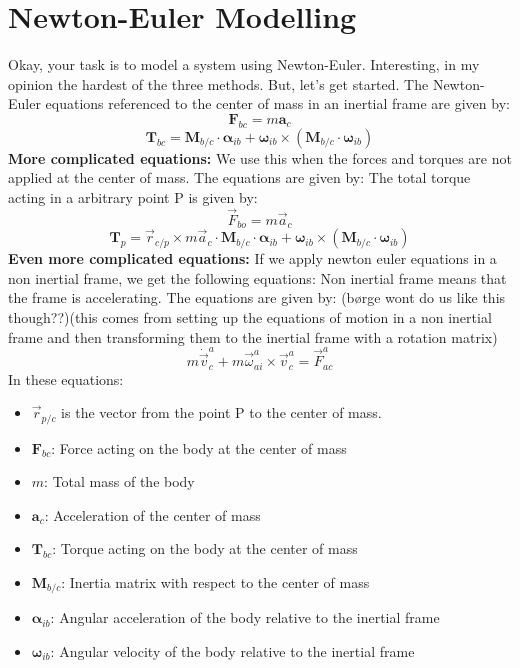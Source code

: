 \section{Newton-Euler Modelling}
Okay, your task is to model a system using Newton-Euler. Interesting, in my opinion the hardest of the three methods. But, let's get started.\newline
The Newton-Euler equations referenced to the center of mass in an inertial frame are given by:
\begin{equation}
    \mathbf{F}_{bc} = m \mathbf{a}_c
\end{equation}
\begin{equation}
    \mathbf{T}_{bc} = \mathbf{M}_{b/c} \cdot \boldsymbol{\alpha}_{ib} + \boldsymbol{\omega}_{ib} \times \left( \mathbf{M}_{b/c} \cdot \boldsymbol{\omega}_{ib} \right)
\end{equation}
\textbf{More complicated equations: } \newline
We use this when the forces and torques are not applied at the center of mass. The equations are given by:
The total torque acting in a arbitrary point P is given by:
\begin{equation}
    \vec{F}_{bo} = m \vec{a}_c
\end{equation}
\begin{equation}
    \mathbf{T}_{p} = \vec{r}_{c/p} \times m \vec{a}_c \cdot \mathbf{M}_{b/c} \cdot \boldsymbol{\alpha}_{ib} + \boldsymbol{\omega}_{ib} \times \left( \mathbf{M}_{b/c} \cdot \boldsymbol{\omega}_{ib} \right)
\end{equation}   
\textbf{Even more complicated equations: } \newline
If we apply newton euler equations in a non inertial frame, we get the following equations:
Non inertial frame means that the frame is accelerating. The equations are given by:
(børge wont do us like this though??)(this comes from setting up the equations of motion in a non inertial frame and then transforming them to the inertial frame with a rotation matrix)
\begin{equation}
    m \dot{\vec{v}}_c^a + m \vec{\omega}_{ai}^a \times \vec{v}_c^a = \vec{F}_{ac}^{a}
\end{equation}
In these equations:
\begin{itemize}
    \item $\vec{r}_{p/c}$ is the vector from the point P to the center of mass.
    \item $\mathbf{F}_{bc}$: Force acting on the body at the center of mass
    \item $m$: Total mass of the body
    \item $\mathbf{a}_c$: Acceleration of the center of mass
    \item $\mathbf{T}_{bc}$: Torque acting on the body at the center of mass
    \item $\mathbf{M}_{b/c}$: Inertia matrix with respect to the center of mass
    \item $\boldsymbol{\alpha}_{ib}$: Angular acceleration of the body relative to the inertial frame
    \item $\boldsymbol{\omega}_{ib}$: Angular velocity of the body relative to the inertial frame
\end{itemize}
